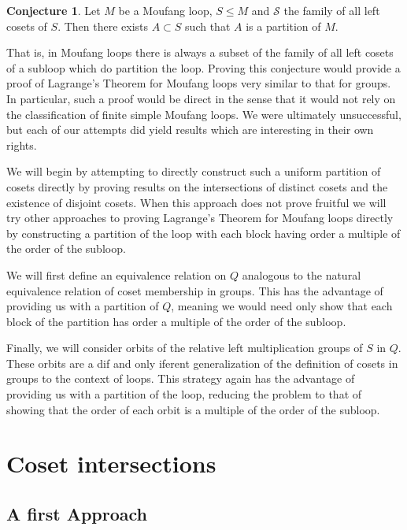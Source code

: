 \documentclass[12pt]{report}
\theoremstyle{definition}
\newtheorem{cnj}[thm]{Conjecture}
\begin{document}
\begin{cnj}
  Let $M$ be a Moufang loop, $S \leq M$ and $\mathcal{S}$ the family of all left cosets of $S$.
    Then there exists $A\subset S$ such that $A$ is a partition of $M$.
\end{cnj}

That is, in Moufang loops there is always a subset of the family of all left cosets of a
  subloop which do partition the loop. Proving this conjecture would provide a proof of
  Lagrange's Theorem for Moufang loops very similar to that for groups. In particular,
  such a proof would be direct in the sense that it would not rely on the classification
  of finite simple Moufang loops. We were ultimately unsuccessful, but each of our attempts
  did yield results which are interesting in their own rights.

We will begin by attempting to directly construct such a uniform partition of cosets directly
  by proving results on the intersections of distinct cosets and the existence of disjoint
  cosets. When this approach does not prove fruitful we will try other approaches to proving
  Lagrange's Theorem for Moufang loops directly by constructing a partition of the loop with
  each block having order a multiple of the order of the subloop.

We will first define an equivalence relation on $Q$ analogous to the natural equivalence relation
  of coset membership in groups. This has the advantage of providing us with a partition of $Q$,
  meaning we would need only show that each block of the partition has order a multiple of the
  order of the subloop.

Finally, we will consider orbits of the relative left multiplication groups of $S$ in $Q$. These
  orbits are a dif and only iferent generalization of the definition of cosets in groups to the context of loops.
  This strategy again has the advantage of providing us with a partition of the loop, reducing the
  problem to that of showing that the order of each orbit is a multiple of the order of the subloop.


\section{Coset intersections}

\subsection{A first Approach}
\end{document}
